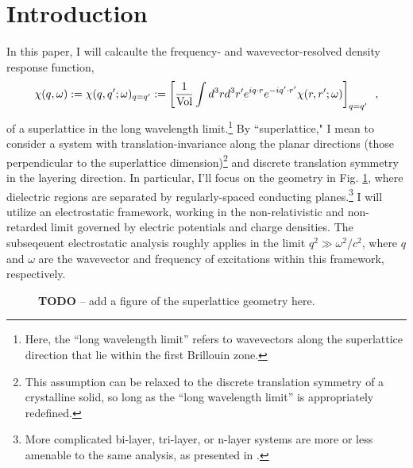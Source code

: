 \section*{Introduction}

In this paper, I will calcaulte the frequency- and wavevector-resolved density response function,
\begin{equation}
    \label{Fourier chi}
    \chi(q,\omega):=\chi(q,q';\omega)_{q=q'}
    :=
    \left[\frac{1}{\text{Vol}}\int d^3 r d^3 r' e^{iq\cdot r} e^{-i q'\cdot r'}\chi(r,r';\omega)\right]_{q=q'}
    \,\,\,,
\end{equation}
of a superlattice in the long wavelength limit.\footnote{Here, the ``long wavelength limit'' refers to wavevectors along the superlattice direction that lie within the first Brillouin zone.}  By ``superlattice," I mean to consider a system with translation-invariance along the planar directions (those perpendicular to the superlattice dimension)\footnote{This assumption can be relaxed to the discrete translation symmetry of a crystalline solid, so long as the ``long wavelength limit'' is appropriately redefined.} and discrete translation symmetry in the layering direction.  In particular, I'll focus on the geometry in Fig. \ref{figure: superlattice geometry}, where dielectric regions are separated by regularly-spaced conducting planes.\footnote{More complicated bi-layer, tri-layer, or n-layer systems are more or less amenable to the same analysis, as presented in \cite{Cottam1993, Cottam2004}.}  I will utilize an electrostatic framework, working in the non-relativistic and non-retarded limit governed by electric potentials and charge densities.  The subseqeuent electrostatic analysis roughly applies in the limit $q^2\gg \omega^2/c^2$, where $q$ and $\omega$ are the wavevector and frequency of excitations within this framework, respectively.

\begin{figure}
    \centering
    \caption{
    {\bf TODO} -- add a figure of the superlattice geometry here.
    }
    \label{figure: superlattice geometry}
\end{figure}
